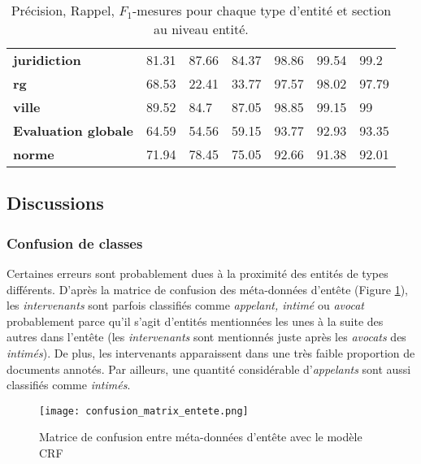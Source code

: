 \begin{table}[!ht]
\begin{tabular}{|l|l|l|l|l|l|l|}
		\textbf{juridiction}   & 81.31              & 87.66           & 84.37       & 98.86              & 99.54           & 99.2        \\ 
		\textbf{rg}            & 68.53              & 22.41           & 33.77       & 97.57              & 98.02           & 97.79       \\ 
		\textbf{ville}         & 89.52              & 84.7            & 87.05       & 98.85              & 99.15           & 99          \\ \hline
		\textbf{Evaluation globale} & 64.59              & 54.56           & 59.15       & 93.77              & 92.93           & 93.35       \\ \hline
				\noalign{\smallskip}\hline\noalign{\smallskip}
		\textbf{norme}         & 71.94              & 78.45           & 75.05       & 92.66              & 91.38           & 92.01       \\ \hline
	\end{tabular}
	\caption{Précision, Rappel, $F_1$-mesures pour chaque type d'entité et section au niveau entité.}\label{tab:structuration:perf-detail-entity}
\end{table}

\subsection{Discussions}
\subsubsection{Confusion de classes}
Certaines erreurs sont probablement dues à la proximité des entités de types différents. D'après la matrice de confusion des méta-données d'entête (Figure \ref{fig:structuration:matrice-confusion-entete}), les \textit{intervenants} sont parfois classifiés comme \textit{appelant, intimé} ou \textit{avocat} probablement parce qu'il s'agit d'entités mentionnées les unes à la suite des autres dans l'entête (les \textit{intervenants} sont mentionnés juste après les \textit{avocats} des \textit{intimés}). De plus, les intervenants apparaissent dans une très faible proportion de documents annotés.  Par ailleurs, une quantité considérable d'\textit{appelants} sont aussi classifiés comme \textit{intimés}. 

\begin{figure}[ht]
    \centering
    \texttt{[image: confusion\_matrix\_entete.png]}
    \caption{Matrice de confusion entre méta-données d'entête avec le modèle CRF}
    \label{fig:structuration:matrice-confusion-entete}
\end{figure}

